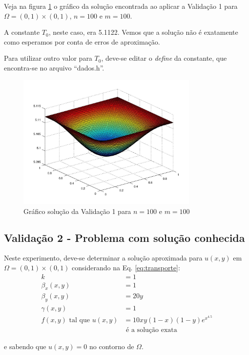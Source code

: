 \documentclass[
	11pt,				%
	oneside,			%
	a4paper,			%
	english,			%
	brazil,				%
	]{article}
\begin{document}
Veja na figura \ref{fig:v1_100-100} o gráfico da solução encontrada ao aplicar 
a Validação 1 para $\Omega = (0,1)\times(0,1)$, $n = 100$ e $m = 100$.

A constante $T_0$, neste caso, era 5.1122. Vemos que a solução não é 
exatamente como esperamos por conta de erros de aproximação.

Para utilizar outro valor para $T_0$, deve-se editar o \textit{define} da 
constante, que encontra-se no arquivo ``dados.h''.

\begin{figure}[h]
    \centering
    \includegraphics[width=0.8\textwidth]{v1_100-100.jpg}
    \caption{Gráfico solução da Validação 1 para $n = 100$ e $m = 100$}
    \label{fig:v1_100-100}
\end{figure}

\subsection{Validação 2 - Problema com solução conhecida}
Neste experimento, deve-se determinar a solução aproximada para $u(x,y)$ em 
$\Omega = (0,1) \times (0,1)$ considerando na Eq.
\eqref{eq:transporte}:
\begin{align}\label{eq:v2}
k &= 1\nonumber \\
\beta_x(x,y) &= 1\nonumber \\
\beta_y(x,y) &= 20y\nonumber \\
\gamma(x,y) &= 1\nonumber \\
f(x,y) \text{ tal que } u(x,y) &= 10xy(1-x)(1-y)e^{x^{4.5}}\\
&\text{ é a solução exata }\nonumber
\end{align}

e sabendo que $u(x,y) = 0$ no contorno de $\Omega$.
\end{document}
